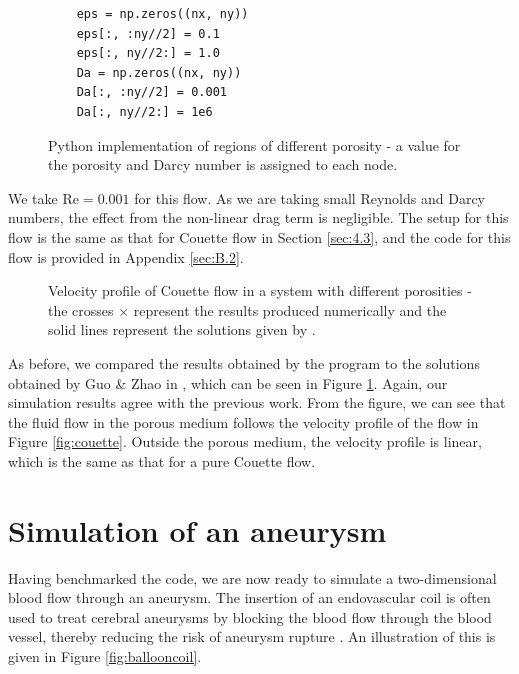 \documentclass[a4paper, 11pt]{report}
\begin{document}
\begin{figure}[!htb]{\small
\begin{mdframed}[backgroundcolor=red!10, linecolor=red!10]
\begin{verbatim}
    eps = np.zeros((nx, ny))
    eps[:, :ny//2] = 0.1
    eps[:, ny//2:] = 1.0
    Da = np.zeros((nx, ny))
    Da[:, :ny//2] = 0.001
    Da[:, ny//2:] = 1e6
\end{verbatim}
\end{mdframed}
}
\caption[Python implementation of regions of different porosity]{Python implementation of regions of different porosity - a value for the porosity and Darcy number is assigned to each node.}
\end{figure}

We take $\mathrm{Re}=0.001$ for this flow. As we are taking small Reynolds and Darcy numbers, the effect from the non-linear drag term is negligible. The setup for this flow is the same as that for Couette flow in Section \ref{sec:4.3}, and the code for this flow is provided in Appendix \ref{sec:B.2}.

\begin{figure}[!htb]
    \centering
    
    \caption[Velocity profile of Couette flow in a system with different porosities]{Velocity profile of Couette flow in a system with different porosities - the crosses $\times$ represent the results produced numerically and the solid lines represent the solutions given by \cite{guo+zhao}.}
    \label{fig:couette_vary}
\end{figure}

As before, we compared the results obtained by the program to the solutions obtained by Guo \& Zhao in \cite{guo+zhao}, which can be seen in Figure \ref{fig:couette_vary}. Again, our simulation results agree with the previous work. From the figure, we can see that the fluid flow in the porous medium follows the velocity profile of the flow in Figure \ref{fig:couette}. Outside the porous medium, the velocity profile is linear, which is the same as that for a pure Couette flow.


\chapter{Simulation of an aneurysm} \label{chap:5}
Having benchmarked the code, we are now ready to simulate a two-dimensional blood flow through an aneurysm. The insertion of an endovascular coil is often used to treat cerebral aneurysms by blocking the blood flow through the blood vessel, thereby reducing the risk of aneurysm rupture \cite{MORALES2013}. An illustration of this is given in Figure \ref{fig:ballooncoil}.
\end{document}
